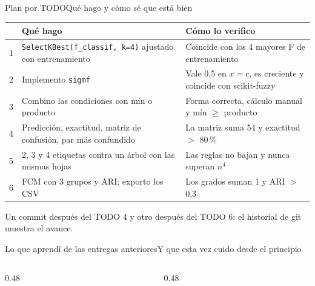 \documentclass[aspectratio=169,10pt]{beamer}
\begin{document}
\begin{frame}{Plan por TODO}{Qué hago y cómo sé que está bien}
  \small
  \begin{tabular}{@{}p{0.6cm}p{5.0cm}p{5.6cm}@{}}
    \toprule
    & \textbf{Qué hago} & \textbf{Cómo lo verifico} \\
    \midrule
    1 & \texttt{SelectKBest(f\_classif, k=4)} ajustado con entrenamiento & Coincide con los 4 mayores F de entrenamiento \\
    2 & Implemento \texttt{sigmf} & Vale 0,5 en $x=c$, es creciente y coincide con scikit-fuzzy \\
    3 & Combino las condiciones con mín o producto & Forma correcta, cálculo manual y mín $\ge$ producto \\
    4 & Predicción, exactitud, matriz de confusión, par más confundido & La matriz suma 54 y exactitud $>$ 80\,\% \\
    5 & 2, 3 y 4 etiquetas contra un árbol con las mismas hojas & Las reglas no bajan y nunca superan $n^4$ \\
    6 & FCM con 3 grupos y ARI; exporto los CSV & Los grados suman 1 y ARI $>$ 0,3 \\
    \bottomrule
  \end{tabular}
  \vspace{0.2cm}

  {\footnotesize\color{UDSilver} Un commit después del TODO 4 y otro después del TODO 6: el historial de git muestra el avance.}
\end{frame}

\begin{frame}{Lo que aprendí de las entregas anteriores}{Y que esta vez cuido desde el principio}
  \begin{columns}[T,onlytextwidth]
    \begin{column}{0.48\textwidth}
      \vspace{0.15cm}
    \end{column}
    \begin{column}{0.48\textwidth}
      \vspace{0.15cm}
    \end{column}
  \end{columns}
\end{frame}
\end{document}
